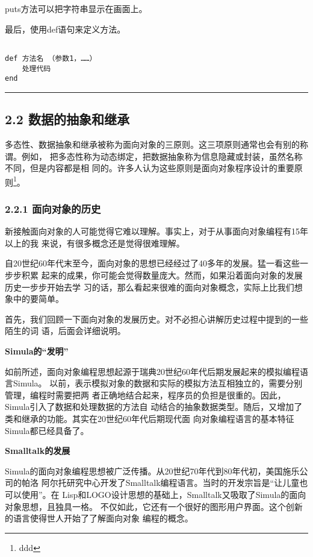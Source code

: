 \documentclass[11pt]{ctexart}
\begin{document}
puts方法可以把字符串显示在画面上。

最后，使用def语句来定义方法。
\lstset{language=org,label= ,caption= ,captionpos=b,numbers=none}
\begin{lstlisting}

def 方法名 （参数1，……）
    处理代码
end
\end{lstlisting}

\noindent\rule{\textwidth}{0.5pt}

\subsection{2.2 数据的抽象和继承}
\label{sec:org150d62e}

多态性、数据抽象和继承被称为面向对象的三原则。这三项原则通常也会有别的称谓。例如，
把多态性称为动态绑定，把数据抽象称为信息隐藏或封装，虽然名称不同，但是内容都是相
同的。许多人认为这些原则是面向对象程序设计的重要原则\footnote{ddd}。
\subsubsection{2.2.1 面向对象的历史}
\label{sec:orgd791420}

新接触面向对象的人可能觉得它难以理解。事实上，对于从事面向对象编程有15年以上的我
来说，有很多概念还是觉得很难理解。

自20世纪60年代末至今，面向对象的思想已经经过了40多年的发展。猛一看这些一步步积累
起来的成果，你可能会觉得数量庞大。然而，如果沿着面向对象的发展历史一步步开始去学
习的话，那么看起来很难的面向对象概念，实际上比我们想象中的要简单。

首先，我们回顾一下面向对象的发展历史。对不必担心讲解历史过程中提到的一些陌生的词
语，后面会详细说明。

\textbf{Simula的“发明”}

如前所述，面向对象编程思想起源于瑞典20世纪60年代后期发展起来的模拟编程语言Simula。
以前，表示模拟对象的数据和实际的模拟方法互相独立的，需要分别管理，编程时需要把两
者正确地结合起来，程序员的负担是很重的。因此，Simula引入了数据和处理数据的方法自
动结合的抽象数据类型。随后，又增加了类和继承的功能。其实在20世纪60年代后期现代面
向对象编程语言的基本特征Simula都已经具备了。


\textbf{Smalltalk的发展}

Simula的面向对象编程思想被广泛传播。从20世纪70年代到80年代初，美国施乐公司的帕洛
阿尔托研究中心开发了Smalltalk编程语言。当时的开发宗旨是“让儿童也可以使用”。在
Lisp和LOGO设计思想的基础上，Smalltalk又吸取了Simula的面向对象思想，且独具一格。
不仅如此，它还有一个很好的图形用户界面。这个创新的语言使得世人开始了了解面向对象
编程的概念。
\end{document}
